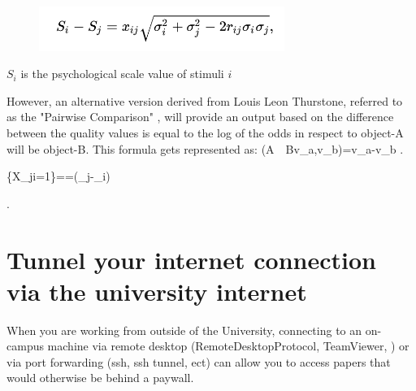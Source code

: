 		\begin{figure}[h]
			\includegraphics[width=8cm]{graphics/LCJ_formula.png}
			\centering
		\end{figure}
	
		 $S_{i}$ is the psychological scale value of stimuli $i$
		
		However, an alternative version derived from Louis Leon Thurstone, referred to as the "Pairwise Comparison" \cite{thurstone1927law}, will provide an output based on the difference between the quality values is equal to the log of the odds in respect to object-A will be object-B. This formula gets represented as: 
		\displaystyle {} (A\ {}\ B\mid v_{a},v_{b})=v_{a}-v_{b} .
		
		\Pr\{X_{ji}=1\}={}=\sigma (\delta _{j}-\delta _{i})
		
		 .


	\section{Tunnel your internet connection via the university internet}

When you are working from outside of the University, connecting to an on-campus machine via remote desktop (RemoteDesktopProtocol, TeamViewer, \etc) or via port forwarding (ssh, ssh tunnel, ect) can allow you to access papers that would otherwise be behind a paywall. 
		
